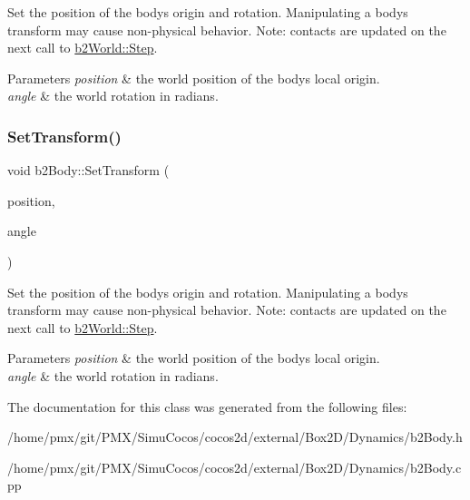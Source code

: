Set the position of the body\textquotesingle{}s origin and rotation. Manipulating a body\textquotesingle{}s transform may cause non-\/physical behavior. Note\+: contacts are updated on the next call to \hyperlink{classb2World_a7a8eff61af98461f978fe43f3af7be90}{b2\+World\+::\+Step}. 
\begin{DoxyParams}{Parameters}
{\em position} & the world position of the body\textquotesingle{}s local origin. \\
\hline
{\em angle} & the world rotation in radians. \\
\hline
\end{DoxyParams}
\mbox{\label{classb2Body_a4686f32bbce5723761e9719c706eca11}} 
\subsubsection{\texorpdfstring{Set\+Transform()}{SetTransform()}\hspace{0.1cm}{\footnotesize\ttfamily [2/2]}}
{\footnotesize\ttfamily void b2\+Body\+::\+Set\+Transform (\begin{DoxyParamCaption}\item[{const \hyperlink{structb2Vec2}{b2\+Vec2} \&}]{position,  }\item[{float32}]{angle }\end{DoxyParamCaption})}

Set the position of the body\textquotesingle{}s origin and rotation. Manipulating a body\textquotesingle{}s transform may cause non-\/physical behavior. Note\+: contacts are updated on the next call to \hyperlink{classb2World_a7a8eff61af98461f978fe43f3af7be90}{b2\+World\+::\+Step}. 
\begin{DoxyParams}{Parameters}
{\em position} & the world position of the body\textquotesingle{}s local origin. \\
\hline
{\em angle} & the world rotation in radians. \\
\hline
\end{DoxyParams}


The documentation for this class was generated from the following files\+:\begin{DoxyCompactItemize}
\item 
/home/pmx/git/\+P\+M\+X/\+Simu\+Cocos/cocos2d/external/\+Box2\+D/\+Dynamics/b2\+Body.\+h\item 
/home/pmx/git/\+P\+M\+X/\+Simu\+Cocos/cocos2d/external/\+Box2\+D/\+Dynamics/b2\+Body.\+cpp\end{DoxyCompactItemize}
